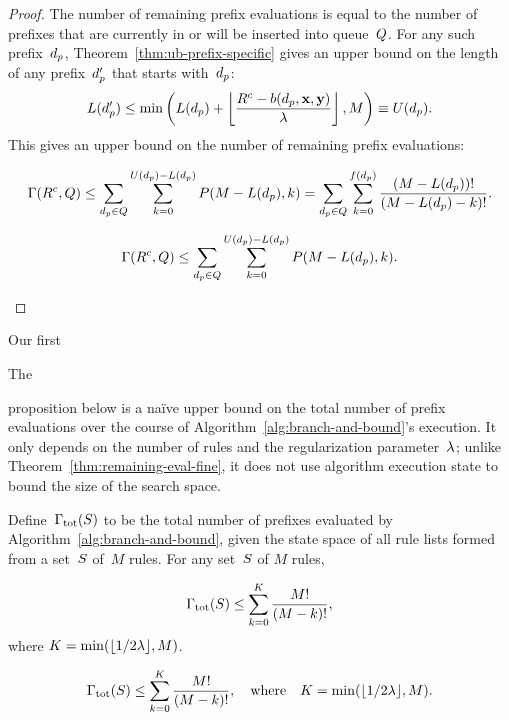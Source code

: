 \begin{proof}
The number of remaining prefix evaluations is equal to the number of
prefixes that are currently in or will be inserted into queue~$Q$.
%
For any such prefix~$d_p$, Theorem~\ref{thm:ub-prefix-specific}
gives an upper bound on the length of any prefix~$d_p'$
that starts with~$d_p$:
\begin{align}
L(d_p') \le \min \left( L(d_p) + \left\lfloor \frac{{R^c} - b(d_p, \mathbf{x}, \mathbf{y})}{{\lambda}} \right\rfloor, M \right)
\equiv U(d_p).
\end{align}
This gives an upper bound on the number of remaining prefix evaluations:
\begin{arxiv}
\begin{align}
\Gamma({R^c}, Q)
\le \sum_{d_p \in Q} \sum_{k=0}^{U(d_p) - L(d_p)} P(M - L(d_p), k)
= \sum_{d_p \in Q} \sum_{k=0}^{f(d_p)} \frac{(M - L(d_p))!}{(M - L(d_p) - k)!}.
\end{align}
\end{arxiv}
\begin{kdd}
\begin{align}
\Gamma({R^c}, Q)
\le \sum_{d_p \in Q} \sum_{k=0}^{U(d_p) - L(d_p)} P(M - L(d_p), k).
\end{align}
\end{kdd}
\end{proof}

\begin{arxiv}
Our first
\end{arxiv}
\begin{kdd}
The
\end{kdd}
proposition below is a na\"ive upper bound on
the total number of prefix evaluations over the course of
Algorithm~\ref{alg:branch-and-bound}'s execution.
%
It only depends on the number of rules and
the regularization parameter~${\lambda}$;
\ie unlike Theorem~\ref{thm:remaining-eval-fine},
it does not use algorithm execution state to
bound the size of the search space.

\begin{proposition}
\label{thm:ub-total-eval}
Define~${\Gamma_{\textnormal{tot}}}(S)$ to be the total number of prefixes
evaluated by Algorithm~\ref{alg:branch-and-bound}, given the state space of
all rule lists formed from a set~$S$ of~$M$ rules.
%
For any set~$S$ of $M$ rules,
\begin{arxiv}
\begin{align}
{\Gamma_{\textnormal{tot}}}(S) \le \sum_{k=0}^K \frac{M!}{(M - k)!},
\label{eq:size-naive}
\end{align}
where ${K = \min(\lfloor 1/2 {\lambda} \rfloor, M)}$.
\end{arxiv}
\begin{kdd}
\begin{align}
{\Gamma_{\textnormal{tot}}}(S) \le \sum_{k=0}^K \frac{M!}{(M - k)!},
\quad \text{where} \quad K = \min(\lfloor 1/2 {\lambda} \rfloor, M).
\label{eq:size-naive}
\end{align}
\end{kdd}
\end{proposition}

